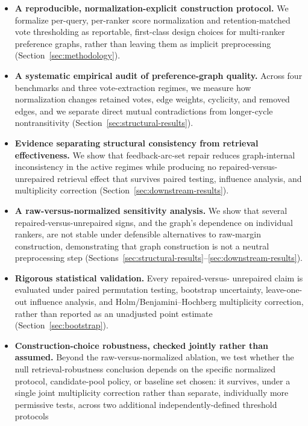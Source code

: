 \documentclass[manuscript,anonymous,review]{acmart}
\begin{document}
\begin{itemize}
  \item \textbf{A reproducible, normalization-explicit construction
    protocol.} We formalize per-query, per-ranker score normalization and
    retention-matched vote thresholding as reportable, first-class design
    choices for multi-ranker preference graphs, rather than leaving them as
    implicit preprocessing (Section~\ref{sec:methodology}).
  \item \textbf{A systematic empirical audit of preference-graph quality.}
    Across four benchmarks and three vote-extraction regimes, we measure how
    normalization changes retained votes, edge weights, cyclicity, and
    removed edges, and we separate direct mutual contradictions from
    longer-cycle nontransitivity (Section~\ref{sec:structural-results}).
  \item \textbf{Evidence separating structural consistency from retrieval
    effectiveness.} We show that feedback-arc-set repair reduces
    graph-internal inconsistency in the active regimes while producing no
    repaired-versus-unrepaired retrieval effect that survives paired testing,
    influence analysis, and multiplicity correction
    (Section~\ref{sec:downstream-results}).
  \item \textbf{A raw-versus-normalized sensitivity analysis.} We show that
    several repaired-versus-unrepaired signs, and the graph's dependence on
    individual rankers, are not stable under defensible alternatives to
    raw-margin construction, demonstrating that graph construction is not a
    neutral preprocessing step
    (Sections~\ref{sec:structural-results}--\ref{sec:downstream-results}).
  \item \textbf{Rigorous statistical validation.} Every repaired-versus-
    unrepaired claim is evaluated under paired permutation testing, bootstrap
    uncertainty, leave-one-out influence analysis, and Holm/Benjamini--Hochberg
    multiplicity correction, rather than reported as an unadjusted point
    estimate (Section~\ref{sec:bootstrap}).
  \item \textbf{Construction-choice robustness, checked jointly rather than
    assumed.} Beyond the raw-versus-normalized ablation, we test whether the
    null retrieval-robustness conclusion depends on the specific normalized
    protocol, candidate-pool policy, or baseline set chosen: it survives,
    under a single joint multiplicity correction rather than separate,
    individually more permissive tests, across two additional
    independently-defined threshold protocols

\end{itemize}
\end{document}
